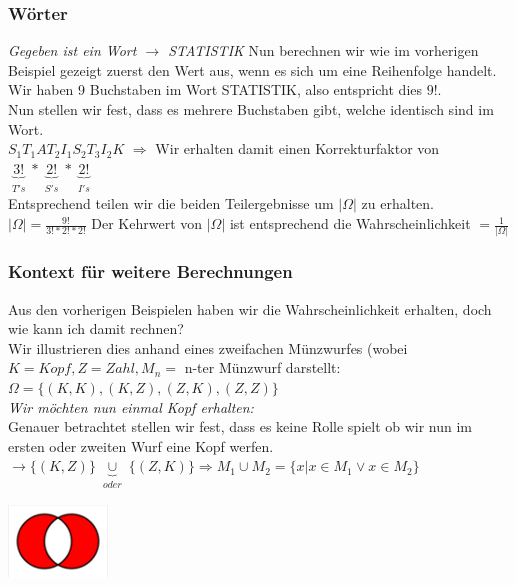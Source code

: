 \documentclass[a4paper]{article}
\newenvironment{Figure}
	{\par\medskip\noindent\minipage{\linewidth}}
	{\endminipage\par\medskip}
\theoremstyle{definition}
\theoremstyle{example}
\begin{document}
\subsubsection{Wörter}
\textit{Gegeben ist ein Wort $\rightarrow$ STATISTIK}
Nun berechnen wir wie im vorherigen Beispiel gezeigt zuerst den Wert aus, wenn es sich um eine Reihenfolge handelt. Wir haben 9 Buchstaben im Wort STATISTIK, also entspricht dies $9!$.\\
Nun stellen wir fest, dass es mehrere Buchstaben gibt, welche identisch sind im Wort.\\
$S_1T_1AT_2I_1S_2T_3I_2K$ $\Rightarrow$ Wir erhalten damit einen Korrekturfaktor von $\underbrace{3!}_{\substack{T's}}*\underbrace{2!}_{\substack{S's}}*\underbrace{2!}_{\substack{I's}}$\\
Entsprechend teilen wir die beiden Teilergebnisse um $|\Omega|$ zu erhalten.\\
$|\Omega| = \frac{9!}{3!*2!*2!}$ Der Kehrwert von $|\Omega|$ ist entsprechend die Wahrscheinlichkeit $=\frac{1}{|\Omega|}$

\subsubsection{Kontext für weitere Berechnungen}
Aus den vorherigen Beispielen haben wir die Wahrscheinlichkeit erhalten, doch wie kann ich damit rechnen?\\
Wir illustrieren dies anhand eines zweifachen Münzwurfes (wobei $K=Kopf, Z=Zahl, M_n =$ n-ter Münzwurf darstellt:\\
$\Omega = \{(K,K), (K,Z), (Z,K), (Z,Z)\}$\\
\textit{Wir möchten nun einmal Kopf erhalten:}\\
Genauer betrachtet stellen wir fest, dass es keine Rolle spielt ob wir nun im ersten oder zweiten Wurf eine Kopf werfen. $\rightarrow \{(K,Z)\} \underbrace{\cup}_{\substack{oder}} \{(Z,K)\} \Rightarrow M_1 \cup M_2 = \{x | x \in M_1 \vee x \in M_2\}$
\begin{Figure}
\centering
\includegraphics[width=100px]{img/keineSchnittmenge.png}
	\label{fig:keine Schnittmengen}
\end{Figure}
\end{document}
